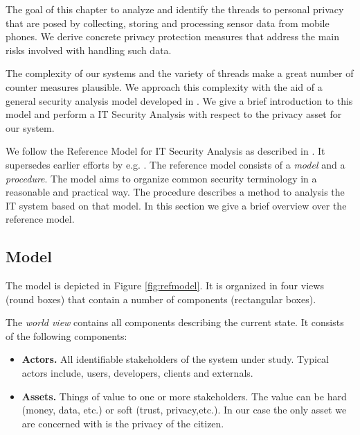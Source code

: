 \documentclass[runningheads,a4paper]{llncs}
\newenvironment{LGContent}
{ \par\color{blue} \it \small }
{ \par }
\begin{document}
\begin{LGContent}

The goal of this chapter to analyze and identify the threads to
personal privacy that are posed by collecting, storing and processing
sensor data from mobile phones.  We derive concrete privacy protection
measures that address the main risks involved with handling such data.

The complexity of our systems and the variety of threads make a great
number of counter measures plausible.  We approach this complexity
with the aid of a general security analysis model developed in
\cite{Grimm:ItSecRefModel}.  We give a brief introduction to this
model and perform a IT Security Analysis with respect to the privacy
asset for our system.

We follow the Reference Model for IT Security Analysis as described in
\cite{Grimm:ItSecRefModel}.  It supersedes earlier efforts by
e.g. \cite{Avizienis}.  The reference model consists of a \emph{model}
and a \emph{procedure}.  The model aims to organize common security
terminology in a reasonable and practical way.  The procedure
describes a method to analysis the IT system based on that model.  In
this section we give a brief overview over the reference model.

\subsection{Model}



The model is depicted in Figure \ref{fig:refmodel}.  It is organized
in four views (round boxes) that contain a number of components
(rectangular boxes).


The \emph{world view} contains all components describing the current state.
It consists of the following components:
\begin{itemize}
\item \textbf{Actors.}
All identifiable stakeholders of the system under study.
Typical actors include, users, developers, clients and externals.

\item
\textbf{Assets.} Things of value to one or more stakeholders.
The value can be hard (money, data, etc.) or soft (trust, privacy,etc.).
In our case the only asset we are concerned with is the privacy of the citizen.


\end{itemize}
\end{LGContent}
\end{document}
